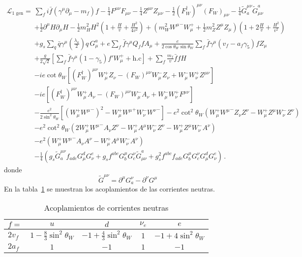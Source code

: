 \begin{align}
  \mathcal{L}_{\text{1 gen}}=&\sum_f i\bar{f}\left(\gamma^\mu\partial_\mu-m_f\right)f
-\tfrac{1}{4}F^{\mu\nu} F_{\mu\nu}-\tfrac{1}{4}Z^{\mu\nu} Z_{\mu\nu}-\tfrac{1}{2}(F_W^\dagger)^{\mu\nu} (F_W)_{\mu\nu}
- \tfrac{1}{4}\widetilde{G}^{\mu\nu}_a \widetilde{G}_{\mu\nu}^a\nonumber\\
&+\tfrac{1}{2}\partial^\mu H\partial_\mu H
-\frac{1}{2}m_H^2H^2\left(1+\frac{H}{v}+\frac{H^2}{4v^2}\right)
+\left(m_W^2{W^\mu}^-W_\mu^++\frac{1}{2}m_Z^2Z^\mu Z_\mu\right)\left(1+2\frac{H}{v}+\frac{H^2}{v^2}\right)\nonumber\\
&+g_s\sum_q\bar{q}\gamma^\mu\left(\frac{\lambda_a}{2}\right)q\,G_\mu^a+e\sum_f \bar{f}\gamma^\mu Q_f f A_\mu+\frac{e}{2\cos\theta_W\sin\theta_W}\sum_{f}\bar{f}\gamma^\mu(v_f-a_f\gamma_5)f Z_\mu\nonumber\\
&+\frac{g}{2\sqrt{2}}\left[\sum_{f}\bar{f}\gamma^\mu(1-\gamma_5)f' W_\mu^++\text{h.c}\right]
+\sum_f \frac{m_f}{v} \bar{f}f H\nonumber\\
&-ie\cot\theta_W\left[(F_W^\dagger)^{\mu\nu}W_\mu^+ Z_\nu-(F_W)^{\mu\nu}W_\mu^- Z_\nu+W_\mu^-W_\nu^+Z^{\mu\nu}\right]\nonumber\\
&-ie\left[(F_W^\dagger)^{\mu\nu}W_\mu^+ A_\nu-(F_W)^{\mu\nu}W_\mu^- A_\nu+W_\mu^-W_\nu^+F^{\mu\nu}\right]\nonumber\\
&-\frac{e^2}{2\sin^2\theta_W}\left[\left(W_\mu^+{W^\mu}^-\right)^2-W_\mu^+{W^\mu}^+W_\nu^-{W^\nu}^-\right]
-e^2\cot^2\theta_W\left(W_\mu^+{W^\mu}^-Z_\nu Z^\nu-W_\mu^+Z^\mu W_\nu^-Z^\nu\right)\nonumber\\
&-e^2\cot^2\theta_W\left(2W_\mu^+{W^\mu}^-A_\nu Z^\nu-W_\mu^+A^\mu W_\nu^-Z^\nu-W_\mu^+Z^\mu W_\nu^-A^\nu\right)\nonumber\\
&-e^2\left(W_\mu^+{W^\mu}^-A_\nu A^\nu-W_\mu^+A^\mu W_\nu^-A^\nu\right)\nonumber\\
&- \frac{1}{4}\left(g_s\widetilde{G}^{\mu\nu}_af_{a d e}G^d_\mu G^e_\nu
    +g_sf^{a b c}G_b^\mu G_c^\nu\widetilde{G}_{\mu\nu}^a
    +g_s^2f^{a b c}f_{a d e}G_b^\mu G_c^\nu G^d_\mu G^e_\nu\right)\,.
\end{align}
donde
\begin{equation}
  \widetilde{G}^{\mu\nu}=\partial^\mu G^\nu_a-\partial^\nu G^\mu
\end{equation}
En la tabla~\ref{tab:zcoup} se muestran los acoplamientos de las corrientes neutras.
\begin{table}  %
  \centering %
  \begin{tabular}{l|c|c|c|c} %
   $f=$ &$u$&$d$&$\nu_e$&$e$\\\hline{}
$2v_f$&$1-\frac{8}{3}\sin^2\theta_W$&$-1+\frac{4}{3}\sin^2\theta_W$&$1$&$-1+4\sin^2\theta_W$\\
$2a_f$&$1$&$-1$&$1$&$-1$\\
  \end{tabular} %
  \caption{Acoplamientos de corrientes neutras} %
\label{tab:zcoup}
\end{table} %

